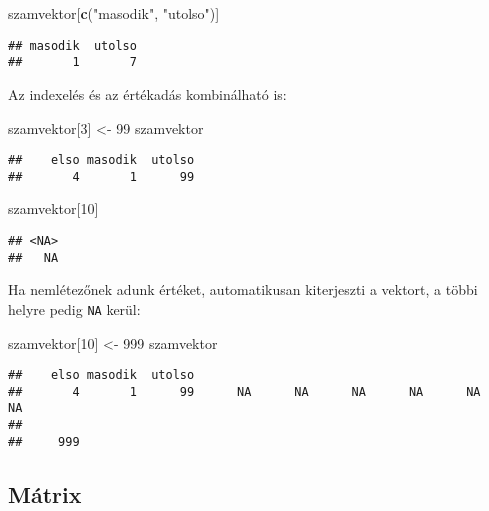 \documentclass[]{book}
\newenvironment{Shaded}{\begin{snugshade}}{\end{snugshade}}
\newcommand{\KeywordTok}[1]{\textcolor[rgb]{0.13,0.29,0.53}{\textbf{#1}}}
\newcommand{\DecValTok}[1]{\textcolor[rgb]{0.00,0.00,0.81}{#1}}
\newcommand{\StringTok}[1]{\textcolor[rgb]{0.31,0.60,0.02}{#1}}
\newcommand{\NormalTok}[1]{#1}
\begin{document}
\begin{Shaded}
\begin{Highlighting}[]
\NormalTok{szamvektor[}\KeywordTok{c}\NormalTok{(}\StringTok{"masodik"}\NormalTok{, }\StringTok{"utolso"}\NormalTok{)]}
\end{Highlighting}
\end{Shaded}

\begin{verbatim}
## masodik  utolso 
##       1       7
\end{verbatim}

Az indexelés és az értékadás kombinálható is:

\begin{Shaded}
\begin{Highlighting}[]
\NormalTok{szamvektor[}\DecValTok{3}\NormalTok{] <-}\StringTok{ }\DecValTok{99}
\NormalTok{szamvektor}
\end{Highlighting}
\end{Shaded}

\begin{verbatim}
##    elso masodik  utolso 
##       4       1      99
\end{verbatim}

\begin{Shaded}
\begin{Highlighting}[]
\NormalTok{szamvektor[}\DecValTok{10}\NormalTok{]}
\end{Highlighting}
\end{Shaded}

\begin{verbatim}
## <NA> 
##   NA
\end{verbatim}

Ha nemlétezőnek adunk értéket, automatikusan kiterjeszti a vektort, a
többi helyre pedig \texttt{NA} kerül:

\begin{Shaded}
\begin{Highlighting}[]
\NormalTok{szamvektor[}\DecValTok{10}\NormalTok{] <-}\StringTok{ }\DecValTok{999}
\NormalTok{szamvektor}
\end{Highlighting}
\end{Shaded}

\begin{verbatim}
##    elso masodik  utolso                                                 
##       4       1      99      NA      NA      NA      NA      NA      NA 
##         
##     999
\end{verbatim}

\subsection{Mátrix}\label{matrix}
\end{document}
